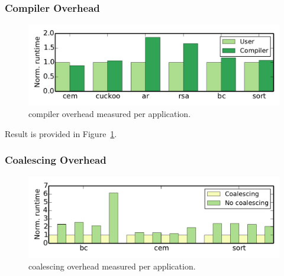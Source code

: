 
\subsubsection{\sys Compiler Overhead}
\label{sec:result_compiler_time}

\begin{figure}
	\centering
	\includegraphics[width=\columnwidth]{figures/comp_user}
	\caption{\sys compiler overhead measured per application.}
	\label{fig:comp_user}
\end{figure}

Result is provided in Figure~\ref{fig:comp_user}.

\subsubsection{\sys Coalescing Overhead}
\label{sec:result_compiler_time}

\begin{figure}
	\centering
	\includegraphics[width=\columnwidth]{figures/coalescing}
	\caption{\sys coalescing overhead measured per application.}
	\label{fig:coalescing}
\end{figure}

